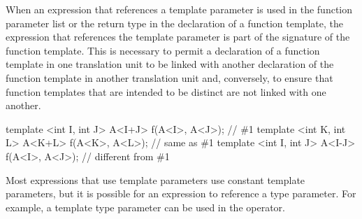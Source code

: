 \pnum
When an expression that references a template parameter is used in the
function parameter list or the return type in the declaration of a
function template, the expression that references the template
parameter is part of the signature of the function template.
This is
necessary to permit a declaration of a function template in one
translation unit to be linked with another declaration of the function
template in another translation unit and, conversely, to ensure that
function templates that are intended to be distinct are not linked
with one another.
\begin{example}
\begin{codeblock}
template <int I, int J> A<I+J> f(A<I>, A<J>);   // \#1
template <int K, int L> A<K+L> f(A<K>, A<L>);   // same as \#1
template <int I, int J> A<I-J> f(A<I>, A<J>);   // different from \#1
\end{codeblock}
\end{example}
\begin{note}
Most expressions that use template parameters use constant template
parameters, but it is possible for an expression to reference a type
parameter.
For example, a template type parameter can be used in the
 operator.
\end{note}


